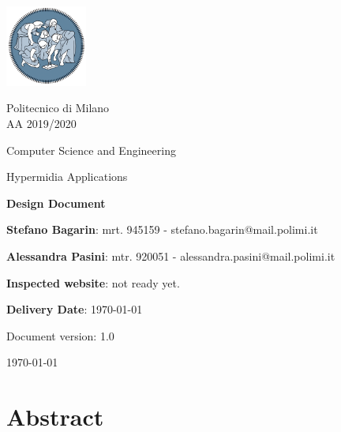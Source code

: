 \documentclass[11pt, a4paperm, hidelinks]{article}
\begin{document}
	\begin{titlepage}
		\centering
		\includegraphics[width=0.20\textwidth]{./assets/polimi-logo.png}\par

		{Politecnico di Milano \\ AA 2019/2020} \par
		\vspace{1.5cm}

		{Computer Science and Engineering}\par
		\Large{Hypermidia Applications}\par
		\vspace{1.0cm}

		{\LARGE \textbf{Design Document} \par}
		\vspace{1.5cm}

		{\normalsize {\textbf{Stefano Bagarin}: mrt. 945159 -  stefano.bagarin@mail.polimi.it }\par}
		\vspace{0.2cm}
		{\normalsize{\textbf{Alessandra Pasini}: mtr. 920051 - alessandra.pasini@mail.polimi.it}\par}
		\vspace{1.0cm}
		
		{\normalsize {\textbf{Inspected website}: not ready yet.}\par}
		\vspace{0.2cm}
		{\normalsize {\textbf{Delivery Date}: \today}\par}
		\vfill

		{\large Document version: 1.0\par}
		{\large \today \par}
	\end{titlepage}

	\tableofcontents
	\clearpage


	\section{Abstract}
	
	\clearpage


\end{document}
